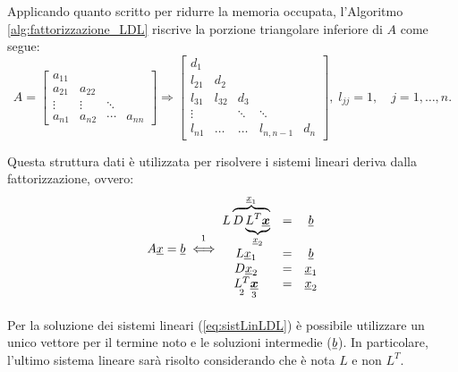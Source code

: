 \begin{remark}
    Applicando quanto scritto per ridurre la memoria occupata, l'Algoritmo \ref{alg:fattorizzazione_LDL} riscrive la porzione triangolare inferiore di $A$ come segue:
    \begin{equation*}
        A=
        \begin{bmatrix}
          a_{11} \\
          a_{21} & a_{22}\\
          \vdots & \vdots & \ddots\\
          a_{n1} & a_{n2} & \cdots & a_{nn}
        \end{bmatrix} \Rightarrow
        \begin{bmatrix}
            d_1\\
            l_{21} & d_2\\
            l_{31} & l_{32} & d_3\\
            \vdots & &\ddots & \ddots\\
            l_{n1} & \hdots & \hdots & l_{n,n-1} & d_n
        \end{bmatrix},\; l_{jj}=1,\quad j = 1,\hdots, n.
    \end{equation*}
    
    Questa struttura dati è utilizzata per risolvere i sistemi lineari deriva dalla fattorizzazione, ovvero:
    \begin{equation}\label{eq:sistLinLDL}
        A\uline x = \uline b\overset{\footnotemark}{\iff}
        \begin{matrix}
            L\overbrace{D\underbrace{L^T\boldsymbol{\uline x}}_{\uline x_2}}^{\uline x_1} &=& \uline b\\
            L \uline x_1 &=& \uline b\\
            D\uline x_2 &=& \uline x_1\\
            \underset{\footnotemark}{L^T} \underset{\footnotemark}{\boldsymbol{\uline x}} &=& \uline x_2
        \end{matrix}
    \end{equation}
\end{remark}

\addtocounter{footnote}{-2}



Per la soluzione dei sistemi lineari (\ref{eq:sistLinLDL}) è possibile utilizzare un unico vettore per il termine noto e le soluzioni intermedie ($\uline b$). In particolare, l'ultimo sistema lineare sarà risolto considerando che è nota $L$ e non $L^T$.

